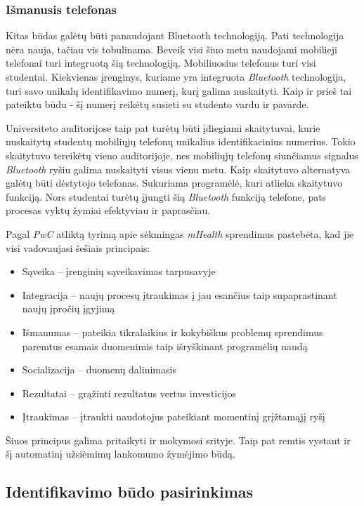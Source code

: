 \documentclass{VUMIFPSkursinis}
\begin{document}
\subsubsection{Išmanusis telefonas}
Kitas būdas galėtų būti panaudojant Bluetooth technologiją. Pati technologija nėra nauja, tačiau vis tobulinama. Beveik visi šiuo metu naudojami mobilieji telefonai turi integruotą šią technologiją. Mobiliuosius telefonus turi visi studentai. Kiekvienas įrenginys, kuriame yra integruota \textit{Bluetooth} technologija, turi savo unikalų identifikavimo numerį, kurį galima nuskaityti. Kaip ir prieš tai pateiktu būdu - šį numerį reikėtų susieti su studento vardu ir pavarde.

Universiteto auditorijose taip pat turėtų būti įdiegiami skaitytuvai, kurie nuskaitytų studentų mobiliųjų telefonų unikalius identifikacinius numerius. Tokio skaitytuvo tereikėtų vieno auditorijoje, nes mobiliųjų telefonų siunčiamus signalus \textit{Bluetooth} ryšiu galima nuskaityti visus vienu metu. Kaip skaitytuvo alternatyva galėtų būti dėstytojo telefonas. Sukuriama programėlė, kuri atlieka skaitytuvo funkciją. Nors studentai turėtų įjungti šią \textit{Bluetooth} funkciją telefone, pats procesas vyktų žymiai efektyviau ir paprasčiau.

Pagal \textit{PwC} atliktą tyrimą apie sėkmingas \textit{mHealth} sprendimus \cite{mhealth} pastebėta, kad jie visi vadovaujasi šešiais principais:

\begin{itemize}
    \item Sąveika – įrenginių sąveikavimas tarpusavyje
    \item Integracija – naujų procesų įtraukimas į jau esančius taip supaprastinant naujų įpročių įgyjimą
    \item Išmanumas – pateikia tikralaikius ir kokybiškus problemų sprendimus paremtus esamais duomenimis taip išryškinant programėlių naudą
    \item Socializacija – duomenų dalinimasis
    \item Rezultatai – grąžinti rezultatus vertus investicijos
    \item Įtraukimas – įtraukti naudotojus pateikiant momentinį grįžtamąjį ryšį
\end{itemize}

Šiuos principus galima pritaikyti ir mokymosi srityje. Taip pat remtis vystant ir šį automatinį užsiėmimų lankomumo žymėjimo būdą.

\subsection{Identifikavimo būdo pasirinkimas}
\end{document}
